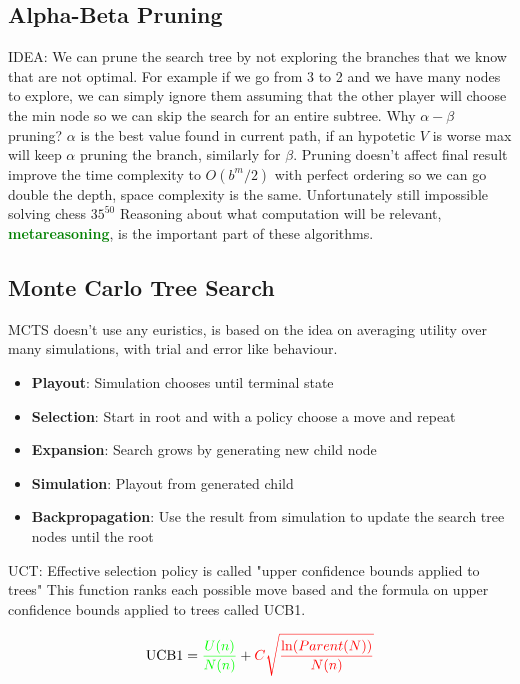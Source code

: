 \documentclass[12pt]{book}
\begin{document}
\subsection{Alpha-Beta Pruning}
IDEA: We can prune the search tree by not exploring the branches that we know that are not optimal.
For example if we go from 3 to 2 and we have many nodes to explore, we can simply ignore them assuming that the other player will choose the min node so we can skip the search for an entire subtree.
Why $\alpha-\beta$ pruning? $\alpha$ is the best value found in current path, if an hypotetic $V$ is worse max will keep $\alpha$ pruning the branch, similarly for $\beta$.
Pruning doesn't affect final result improve the time complexity to $O(b^m/2)$ with perfect ordering so we can go double the depth, space complexity is the same. Unfortunately still impossible solving chess $35^{50}$
Reasoning about what computation will be relevant, \textcolor{green}{\textbf{metareasoning}}, is the important part of these algorithms. 

\subsection{Monte Carlo Tree Search}
MCTS doesn't use any euristics, is based on the idea on averaging utility over many simulations, with trial and error like behaviour.
\newline
\begin{itemize}
	\item \textbf{Playout}: Simulation chooses until terminal state
	\item \textbf{Selection}: Start in root and with a policy choose a move and repeat
	\item \textbf{Expansion}: Search grows by generating new child node
	\item \textbf{Simulation}: Playout from generated child
	\item \textbf{Backpropagation}: Use the result from simulation to update the search tree nodes until the root
\end{itemize}

UCT: Effective selection policy is called "upper confidence bounds applied to trees"
\newline
This function ranks each possible move based and the formula on upper confidence bounds applied to trees called UCB1.
\newline

\begin{equation}
	\text{UCB1} = \textcolor{green}{\frac{U(n)}{N(n)}} + \textcolor{red}{C \sqrt{\frac{\ln(Parent(N))}{N(n)}}}
\end{equation}
\end{document}
